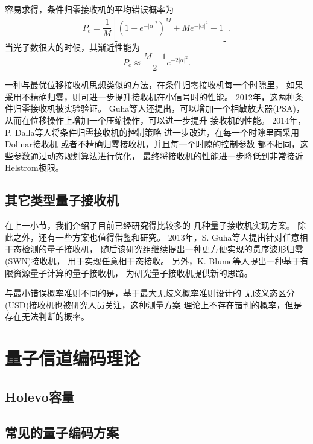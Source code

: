 容易求得，条件归零接收机的平均错误概率为\cite{guha2011approaching,dolinar1982near}
\begin{equation}
P_e = \frac{1}{M}[(1-e^{-|\alpha|^2})^M + M e^{-|\alpha|^2} - 1].
\end{equation}
当光子数很大的时候，其渐近性能为
\begin{equation}
P_e \approx \frac{M-1}{2} e^{-2|\alpha|^2}.
\end{equation}

一种与最优位移接收机思想类似的方法，在条件归零接收机每一个时隙里，
如果采用不精确归零，则可进一步提升接收机在小信号时的性能\cite{guha2011approaching}。
2012年，这两种条件归零接收机被实验验证\cite{chen2012optical}。
Guha等人还提出，可以增加一个相敏放大器(PSA)，
从而在位移操作上增加一个压缩操作，可以进一步提升
接收机的性能\cite{guha2011approaching}。
2014年，P. Dalla等人将条件归零接收机的控制策略
进一步改进，在每一个时隙里面采用Dolinar接收机
或者不精确归零接收机，并且每一个时隙的控制参数
都不相同，这些参数通过动态规划算法进行优化，
最终将接收机的性能进一步降低到非常接近Helstrom极限\cite{dalla2014adaptive}。



\subsection{其它类型量子接收机}
在上一小节，我们介绍了目前已经研究得比较多的
几种量子接收机实现方案。
除此之外，还有一些方案也值得借鉴和研究。
2013年，S. Guha等人提出针对任意相干态检测的量子接收机\cite{da2013achieving}，
随后该研究组继续提出一种更方便实现的贯序波形归零(SWN)接收机，
用于实现任意相干态接收\cite{nair2014realizable}。
另外，K. Blume等人提出一种基于有限资源量子计算的量子接收机\cite{blume2012ideal}，
为研究量子接收机提供新的思路。

与最小错误概率准则不同的是，基于最大无歧义概率准则设计的
无歧义态区分(USD)接收机也被研究人员关注，这种测量方案
理论上不存在错判的概率，但是存在无法判断的概率\cite{becerra2013implementation}。



\section{量子信道编码理论}

\subsection{Holevo容量}






\subsection{常见的量子编码方案}





